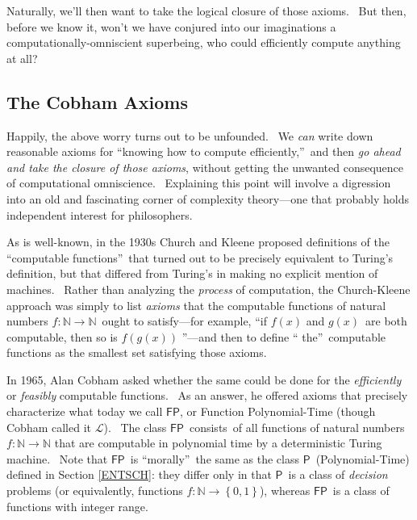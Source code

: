 \documentclass[12pt,onecolumn]{article}%
\begin{document}
\noindent Naturally, we'll then want to take the logical closure of those
axioms. \ But then, before we know it, won't we have conjured into our
imaginations a computationally-omniscient superbeing, who could efficiently
compute anything at all?

\subsection{The Cobham Axioms\label{COBHAM}}

Happily, the above worry turns out to be unfounded. \ We \textit{can} write
down reasonable axioms for \textquotedblleft knowing how to compute
efficiently,\textquotedblright\ and then \textit{go ahead and take the closure
of those axioms}, without getting the unwanted consequence of computational
omniscience. \ Explaining this point will involve a digression into an old and
fascinating corner of complexity theory---one that probably holds independent
interest for philosophers.

As is well-known, in the 1930s Church and Kleene proposed definitions of the
\textquotedblleft computable functions\textquotedblright\ that turned out to
be precisely equivalent to Turing's definition, but that differed from
Turing's in making no explicit mention of machines. \ Rather than analyzing
the \textit{process} of computation, the Church-Kleene approach was simply to
list \textit{axioms} that the computable functions of natural numbers
$f:\mathbb{N}\rightarrow\mathbb{N}$\ ought to satisfy---for example,
\textquotedblleft if $f\left(  x\right)  $ and $g\left(  x\right)  $\ are both
computable, then so is $f\left(  g\left(  x\right)  \right)  $%
\textquotedblright---and then to define \textquotedblleft
the\textquotedblright\ computable functions as the smallest set satisfying
those axioms.

In 1965, Alan Cobham \cite{cobham} asked whether the same could be done for
the \textit{efficiently} or \textit{feasibly} computable functions. \ As an
answer, he offered axioms that precisely characterize what today we call
$\mathsf{FP}$, or Function Polynomial-Time (though Cobham called it
$\mathcal{L}$). \ The class $\mathsf{FP}$\ consists\ of all functions of
natural numbers $f:\mathbb{N}\rightarrow\mathbb{N}$ that are computable in
polynomial time by a deterministic Turing machine. \ Note that $\mathsf{FP}%
$\ is \textquotedblleft morally\textquotedblright\ the same as the class
$\mathsf{P}$\ (Polynomial-Time) defined in Section \ref{ENTSCH}: they differ
only in that $\mathsf{P}$\ is a class of \textit{decision} problems (or
equivalently, functions $f:\mathbb{N}\rightarrow\left\{  0,1\right\}  $),
whereas $\mathsf{FP}$\ is a class of functions with integer range.
\end{document}
